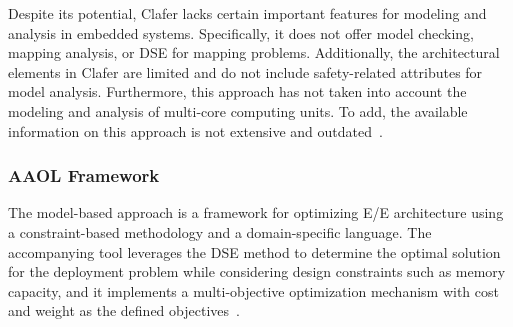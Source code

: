Despite its potential, Clafer lacks certain important features for modeling and analysis in embedded systems. Specifically, it does not offer model checking, mapping analysis, or DSE for mapping problems. Additionally, the architectural elements in Clafer are limited and do not include safety-related attributes for model analysis. Furthermore, this approach has not taken into account the modeling and analysis of multi-core computing units. To add, the available information on this approach is not extensive and outdated~\cite{askaripoor2022architecture}.





\subsubsection{AAOL Framework}
The model-based approach is a framework for optimizing E/E architecture using a constraint-based methodology and a domain-specific language. The accompanying tool leverages the DSE method to determine the optimal solution for the deployment problem while considering design constraints such as memory capacity, and it implements a multi-objective optimization mechanism with cost and weight as the defined objectives~\cite{kugele2015deployment, kugele2014model}.





